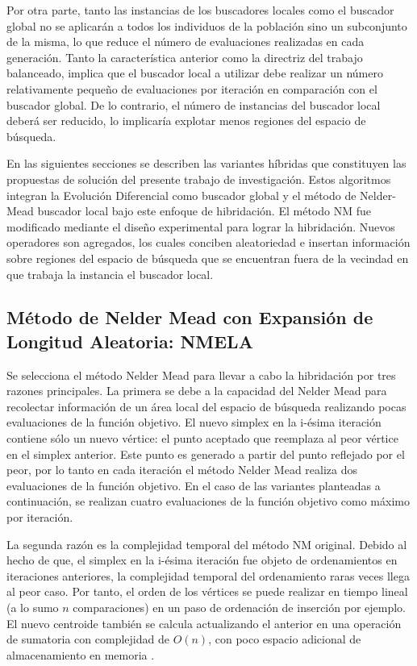 Por otra parte, tanto las instancias de los buscadores locales como el buscador global no se aplicarán a todos los individuos de la población sino un subconjunto de la misma, lo que reduce el número de evaluaciones realizadas en cada generación. Tanto la característica anterior como la directriz del trabajo balanceado, implica que el buscador local a utilizar debe realizar un número relativamente pequeño de evaluaciones por iteración en comparación con el buscador global. De lo contrario, el número de instancias del buscador local deberá ser reducido, lo implicaría explotar menos regiones del espacio de búsqueda. 

En las siguientes secciones se describen las variantes híbridas que constituyen las propuestas de solución del presente trabajo de investigación. Estos algoritmos integran la Evolución Diferencial como buscador global y el método de Nelder-Mead buscador local bajo este enfoque de hibridación. El método NM fue modificado mediante el diseño experimental para lograr la hibridación. Nuevos operadores son agregados, los cuales conciben aleatoriedad e insertan información sobre regiones del espacio de búsqueda que se encuentran fuera de la vecindad en que trabaja la instancia el buscador local.

\subsection{Método de Nelder Mead con Expansión de Longitud Aleatoria: NMELA} \label{sec:NMELA}
Se selecciona el método Nelder Mead para llevar a cabo la hibridación por tres razones principales. La primera se debe a la capacidad del Nelder Mead para recolectar información de un área local del espacio de búsqueda realizando pocas evaluaciones de la función objetivo. El nuevo simplex en la i-ésima iteración contiene sólo un nuevo vértice: el punto aceptado que reemplaza al peor vértice en el simplex anterior. Este punto es generado a partir del punto reflejado por el peor, por lo tanto en cada iteración el método Nelder Mead realiza dos evaluaciones de la función objetivo. En el caso de las variantes planteadas a continuación, se realizan cuatro evaluaciones de la función objetivo como máximo por iteración. 

La segunda razón es la complejidad temporal del método NM original. Debido al hecho de que, el simplex en la  i-ésima iteración fue objeto de ordenamientos en iteraciones anteriores, la complejidad temporal del ordenamiento raras veces llega al peor caso. Por tanto, el orden de los vértices se puede realizar en tiempo lineal (a lo sumo $n$ comparaciones) en un paso de ordenación de inserción por ejemplo. El nuevo centroide también se calcula actualizando el anterior en una operación de sumatoria con complejidad de $O(n)$, con poco espacio  adicional de almacenamiento en memoria \cite{Singer2018}. 


